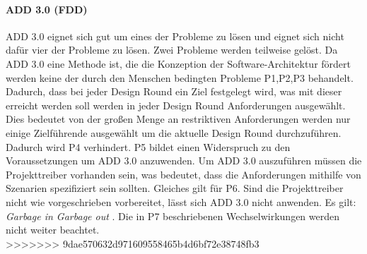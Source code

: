 \paragraph{ADD 3.0 (FDD)}
ADD 3.0 eignet sich gut um eines der Probleme zu l\"osen und eignet sich nicht daf\"ur vier der Probleme zu l\"osen. Zwei Probleme werden teilweise gel\"ost. Da ADD 3.0 eine Methode ist, die die Konzeption der Software-Architektur f\"ordert werden keine der durch den Menschen bedingten Probleme P1,P2,P3 behandelt. Dadurch, dass bei jeder Design Round ein Ziel festgelegt wird, was mit dieser erreicht werden soll werden in jeder Design Round Anforderungen ausgew\"ahlt. Dies bedeutet von der gro\ss{}en Menge an restriktiven Anforderungen werden nur einige Zielf\"uhrende ausgew\"ahlt um die aktuelle Design Round durchzuf\"uhren. Dadurch wird P4 verhindert. P5 bildet einen Widerspruch zu den Voraussetzungen um ADD 3.0 anzuwenden. Um ADD 3.0 auszuf\"uhren m\"ussen die Projekttreiber vorhanden sein, was bedeutet, dass die Anforderungen mithilfe von Szenarien spezifiziert sein sollten. Gleiches gilt f\"ur P6. Sind die Projekttreiber nicht wie vorgeschrieben vorbereitet, l\"asst sich ADD 3.0 nicht anwenden. Es gilt: \emph{Garbage in Garbage out }\cite{Cer01}. Die in P7 beschriebenen Wechselwirkungen werden nicht weiter beachtet.\\
>>>>>>> 9dae570632d971609558465b4d6bf72e38748fb3
